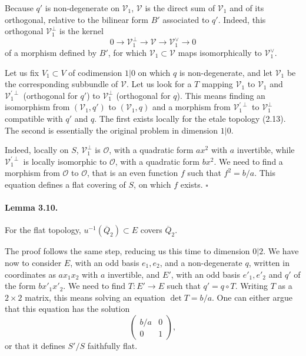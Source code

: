 \documentclass[11pt]{article}
\newcommand{\calO}{\mathcal O}
\newcommand{\barQ}{\overline Q}
\begin{document}
Because $q'$ is non-degenerate on $\mathcal V_1$, $\mathcal V$ is the direct sum of $\mathcal V_1$ and of its orthogonal, relative to the bilinear form $B'$ associated to $q'$. Indeed, this orthogonal $\mathcal V_1^\perp$ is the kernel
\[
0\longrightarrow \mathcal V_1^\perp\longrightarrow \mathcal V\longrightarrow \mathcal V_1^\vee\longrightarrow 0
\]
of a morphism defined by $B'$, for which $\mathcal V_1\subset\mathcal V$ maps isomorphically to $\mathcal V_1^\vee$.

Let us fix $V_1\subset V$ of codimension $1|0$ on which $q$ is non-degenerate, and let $\mathcal V_1$ be the corresponding subbundle of $\mathcal V$. Let us look for a $T$ mapping $\mathcal V_1$ to $\mathcal V_1$ and $\mathcal V_1^{\prime\perp}$ (orthogonal for $q'$) to $\mathcal V_1^\perp$ (orthogonal for $q$). This means finding an isomorphism from $(\mathcal V_1,q')$ to $(\mathcal V_1,q)$ and a morphism from $\mathcal V_1^{\prime\perp}$ to $\mathcal V_1^\perp$ compatible with $q'$ and $q$. The first exists locally for the etale topology (2.13). The second is essentially the original problem in dimension $1|0$.

Indeed, locally on $S$, $\mathcal V_1^\perp$ is $\calO$, with a quadratic form $ax^2$ with $a$ invertible, while $\mathcal V_1^{\prime\perp}$ is locally isomorphic to $\calO$, with a quadratic form $bx^2$. We need to find a morphism from $\calO$ to $\calO$, that is an even function $f$ such that $f^2=b/a$. This equation defines a flat covering of $S$, on which $f$ exists. \hfill $\square$

\paragraph{Lemma 3.10.}
For the flat topology, $u^{-1}(\barQ_2)\subset E$ covers $\barQ_2$.

The proof follows the same step, reducing us this time to dimension $0|2$. We have now to consider $E$, with an odd basis $e_1,e_2$, and a non-degenerate $q$, written in coordinates as $ax_1x_2$ with $a$ invertible, and $E'$, with an odd basis $e'_1,e'_2$ and $q'$ of the form $bx'_1x'_2$. We need to find $T:E'\to E$ such that $q'=q\circ T$. Writing $T$ as a $2\times2$ matrix, this means solving an equation $\det T=b/a$. One can either argue that this equation has the solution
\[
\begin{pmatrix}b/a&0\\0&1\end{pmatrix},
\]
or that it defines $S'/S$ faithfully flat.
\end{document}

